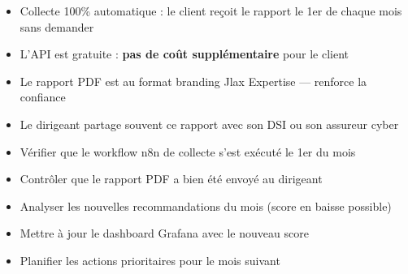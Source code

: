 \documentclass[11pt, a4paper]{article}
\begin{document}
\begin{itemize}
  \item Collecte 100\% automatique : le client reçoit le rapport le 1er de chaque mois sans demander
  \item L'API est gratuite : \textbf{pas de coût supplémentaire} pour le client
  \item Le rapport PDF est au format branding Jlax Expertise — renforce la confiance
  \item Le dirigeant partage souvent ce rapport avec son DSI ou son assureur cyber
\end{itemize}

\begin{checklist}
  \begin{itemize}
    \item[$\square$] Vérifier que le workflow n8n de collecte s'est exécuté le 1er du mois
    \item[$\square$] Contrôler que le rapport PDF a bien été envoyé au dirigeant
    \item[$\square$] Analyser les nouvelles recommandations du mois (score en baisse possible)
    \item[$\square$] Mettre à jour le dashboard Grafana avec le nouveau score
    \item[$\square$] Planifier les actions prioritaires pour le mois suivant
  \end{itemize}
\end{checklist}
\end{document}
